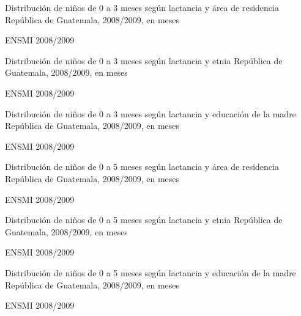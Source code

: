 
%
{%
}%
{%
	Distribución de niños de 0 a 3 meses según lactancia y área de residencia
	} %
{%
	República de Guatemala, 2008/2009, en meses} %
{%
	\begin{tikzpicture}[x=1pt,y=1pt]    \end{tikzpicture}
}%
{%
	ENSMI 2008/2009} %



%
{%
}%
{%
	Distribución de niños de 0 a 3 meses según lactancia y etnia
} %
{%
	República de Guatemala, 2008/2009, en meses} %
{%
	\begin{tikzpicture}[x=1pt,y=1pt]    \end{tikzpicture}
}%
{%
	ENSMI 2008/2009} %



%
{%
}%
{%
	Distribución de niños de 0 a 3 meses según lactancia y educación de la madre
} %
{%
	República de Guatemala, 2008/2009, en meses} %
{%
	\begin{tikzpicture}[x=1pt,y=1pt]    \end{tikzpicture}
}%
{%
	ENSMI 2008/2009} %


%
{%
}%
{%
	Distribución de niños de 0 a 5 meses según lactancia y área de residencia
} %
{%
	República de Guatemala, 2008/2009, en meses} %
{%
	\begin{tikzpicture}[x=1pt,y=1pt]    \end{tikzpicture}
}%
{%
	ENSMI 2008/2009} %



%
{%
}%
{%
	Distribución de niños de 0 a 5 meses según lactancia y etnia
} %
{%
	República de Guatemala, 2008/2009, en meses} %
{%
	\begin{tikzpicture}[x=1pt,y=1pt]    \end{tikzpicture}
}%
{%
	ENSMI 2008/2009} %



%
{%
}%
{%
	Distribución de niños de 0 a 5 meses según lactancia y educación de la madre
} %
{%
	República de Guatemala, 2008/2009, en meses} %
{%
	\begin{tikzpicture}[x=1pt,y=1pt]    \end{tikzpicture}
}%
{%
	ENSMI 2008/2009} %